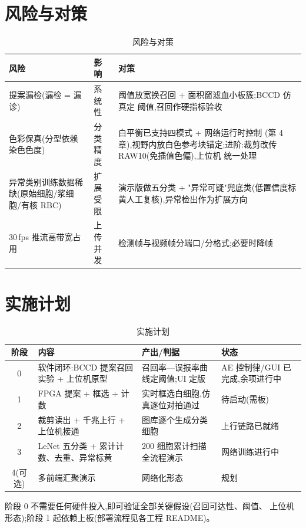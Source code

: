 \section{风险与对策}

\begin{table}[H]\centering\small
\caption{风险与对策}
\begin{tabular}{p{3.4cm}p{2.6cm}p{8.2cm}}
\toprule
风险 & 影响 & 对策 \\
\midrule
提案漏检(漏检 = 漏诊) & 系统性 & 阈值放宽换召回 + 面积窗滤血小板簇;BCCD 仿真定
阈值,召回作硬指标验收 \\
色彩保真(分型依赖染色色度) & 分类精度 & 白平衡已支持四模式 + 网络运行时控制
(第 4 章),视野内放白色参考块锚定;进阶:裁剪改传 RAW10(免插值色偏),上位机
统一处理 \\
异常类别训练数据稀缺(原始细胞/浆细胞/有核 RBC) & 扩展受限 & 演示版做五分类 +
"异常可疑"兜底类(低置信度标黄人工复核),异常检出作为扩展方向 \\
30\,fps 推流高带宽占用 & 上传并发 & 检测帧与视频帧分端口/分格式;必要时降帧 \\
\bottomrule
\end{tabular}
\end{table}

\section{实施计划}

\begin{table}[H]\centering\small
\caption{实施计划}
\begin{tabular}{cp{7.4cm}p{3.6cm}p{2.4cm}}
\toprule
阶段 & 内容 & 产出/判据 & 状态 \\
\midrule
0 & 软件闭环:BCCD 提案召回实验 + 上位机原型 & 召回率—误报率曲线定阈值;UI 定版 &
AE 控制律/GUI 已完成,余项进行中 \\
1 & FPGA 提案 + 框选 + 计数 & 实时框选白细胞,仿真逐位对拍通过 & 待启动(需板) \\
2 & 裁剪读出 + 千兆上行 + 上位机接通 & 图库逐个生成分类细胞 & 上行链路已就绪 \\
3 & LeNet 五分类 + 累计计数、去重、异常标黄 & 200 细胞累计扫描全流程演示 &
网络训练进行中 \\
4(可选) & 多前端汇聚演示 & 网络化形态 & 规划 \\
\bottomrule
\end{tabular}
\end{table}

\noindent 阶段 0 不需要任何硬件投入,即可验证全部关键假设(召回可达性、阈值、
上位机形态);阶段 1 起依赖上板(部署流程见各工程 README)。

